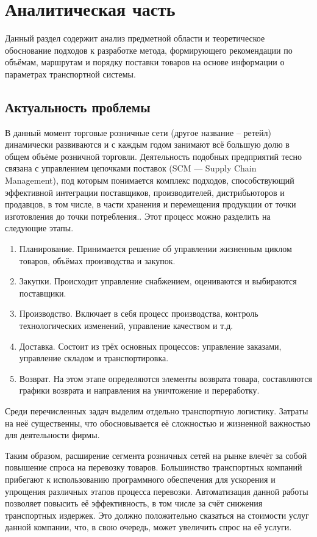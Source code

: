 \section{Аналитическая часть}
Данный раздел содержит анализ предметной области и теоретическое обоснование подходов к разработке метода, формирующего рекомендации по объёмам, маршрутам и порядку поставки товаров на основе информации о параметрах транспортной системы.

\subsection{Актуальность проблемы}
	В данный момент торговые розничные сети (другое название -- ретейл) динамически развиваются и с каждым годом занимают всё большую долю в общем объёме розничной торговли\cite{subj:demand}. Деятельность подобных предприятий тесно связана с управлением цепочками поставок (SCM --- Supply Chain Management), под которым понимается комплекс подходов, способствующий эффективной интеграции поставщиков, производителей, дистрибьюторов и продавцов, в том числе, в части хранения и перемещения продукции от точки изготовления до точки потребления.. Этот процесс можно разделить на следующие этапы\cite{subj:scm}. 
	\begin{enumerate}
		\item Планирование. Принимается решение об управлении жизненным циклом товаров, объёмах производства и закупок.
		\item Закупки. Происходит управление снабжением, оцениваются и выбираются поставщики.
		\item Производство. Включает в себя процесс производства, контроль технологических изменений, управление качеством и т.д.
		\item Доставка. Состоит из трёх основных процессов: управление заказами, управление складом и транспортировка.
		\item Возврат. На этом этапе определяются элементы возврата товара, составляются графики возврата и направления на уничтожение и переработку.
	\end{enumerate}
	
	Среди перечисленных задач выделим отдельно  транспортную логистику. Затраты на неё существенны, что обосновывается её сложностью и жизненной важностью для деятельности фирмы. 
	
	Таким образом, расширение сегмента розничных сетей на рынке влечёт за собой повышение спроса на перевозку товаров. Большинство транспортных компаний прибегают к использованию программного обеспечения для ускорения и упрощения различных этапов процесса перевозки\cite{subj:auto_eff}.  Автоматизация данной работы позволяет повысить её эффективность, в том числе за счёт снижения транспортных издержек. Это должно положительно сказаться на стоимости услуг данной компании, что, в свою очередь, может увеличить спрос на её услуги.


